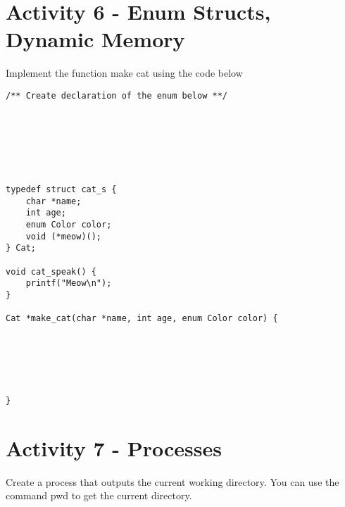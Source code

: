 \documentclass[]{article}
\begin{document}
\section*{Activity 6 - Enum Structs, Dynamic Memory}
Implement the function make cat using the code below

\begin{lstlisting}
/** Create declaration of the enum below **/







typedef struct cat_s {
    char *name;
    int age;
    enum Color color;
    void (*meow)();
} Cat;

void cat_speak() {
    printf("Meow\n");
}

Cat *make_cat(char *name, int age, enum Color color) {






}
\end{lstlisting}

\section*{Activity 7 - Processes}
Create a process that outputs the current working directory. You can use the command pwd to get
the current directory.
\end{document}
